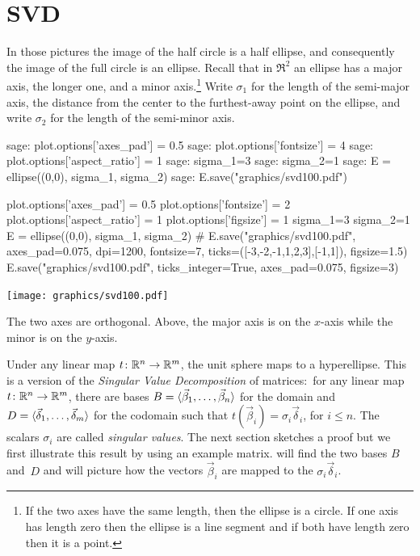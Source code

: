 \section{SVD}
In those pictures the image of the half circle is a half ellipse, and
consequently the image of the full circle is an ellipse.
Recall that in $\Re^2$ an ellipse has a major axis, 
the longer one, and a minor axis.\footnote{%
  If the two axes have the same length, 
  then the ellipse is a circle.
  If one axis has length zero then the ellipse is a line segment 
  and if both have length zero then it is a point.}
Write $\sigma_1$ for the length of the semi-major axis, 
the distance from the center to the furthest-away point on the ellipse,
and write $\sigma_2$ for the length of the semi-minor axis.
\begin{sagecommandline}
sage: plot.options['axes_pad'] = 0.5
sage: plot.options['fontsize'] = 4
sage: plot.options['aspect_ratio'] = 1
sage: sigma_1=3
sage: sigma_2=1
sage: E = ellipse((0,0), sigma_1, sigma_2)
sage: E.save("graphics/svd100.pdf")
\end{sagecommandline}
\begin{sagesilent}
plot.options['axes_pad'] = 0.5
plot.options['fontsize'] = 2
plot.options['aspect_ratio'] = 1
plot.options['figsize'] = 1
sigma_1=3
sigma_2=1
E = ellipse((0,0), sigma_1, sigma_2)
# E.save("graphics/svd100.pdf", axes_pad=0.075, dpi=1200, fontsize=7, ticks=([-3,-2,-1,1,2,3],[-1,1]), figsize=1.5)
E.save("graphics/svd100.pdf", ticks_integer=True, axes_pad=0.075, figsize=3)
\end{sagesilent}
\begin{center}
  \texttt{[image: graphics/svd100.pdf]}
\end{center}
The two axes are orthogonal.
Above, the major axis is on the $x$-axis while the
minor is on the $y$-axis.

Under any linear map $\mbox{$t\colon \mathbb{R}^n\to \mathbb{R}^m$}$, the 
unit sphere maps to a hyperellipse.
This is a version of the \textit{Singular Value Decomposition} of
matrices:~for
any linear map $\mbox{$t\colon \mathbb{R}^n\to \mathbb{R}^m$}$, there are bases
$B=\langle\vec{\beta}_1,\ldots,\vec{\beta}_n\rangle$ for the domain and
$D=\langle\vec{\delta}_1,\ldots,\vec{\delta}_m\rangle$ for the codomain
such that $t(\vec{\beta}_i)=\sigma_i\vec{\delta}_i$, for $i\leq n$.
The scalars $\sigma_i$ are called \textit{singular values}.
The next section sketches a proof
but we first illustrate this result by using an example matrix.
\Sage{} will find the two bases $B$ and~$D$ and will picture how the 
vectors $\vec{\beta}_i$ 
are mapped to the $\sigma_i\vec{\delta}_i$.

